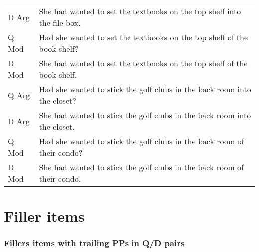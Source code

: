 \documentclass[11pt,oneside]{book}
\begin{document}
\begin{longtable}{ll}
D Arg & She had wanted to set the textbooks on the top shelf into the file box.\\
Q Mod & Had she wanted to set the textbooks on the top shelf of the book shelf?\\
D Mod & She had wanted to set the textbooks on the top shelf of the book shelf.\\
\addlinespace
Q Arg & Had she wanted to stick the golf clubs in the back room into the closet?\\
D Arg & She had wanted to stick the golf clubs in the back room into the closet.\\
Q Mod & Had she wanted to stick the golf clubs in the back room of their condo?\\
D Mod & She had wanted to stick the golf clubs in the back room of their condo.\\*
\end{longtable}

\newpage

\hypertarget{appFill}{%
\chapter{Filler items}\label{appFill}}

\hypertarget{fillers-items-with-trailing-pps-in-qd-pairs}{%
\subsection*{Fillers items with trailing PPs in Q/D pairs}\label{fillers-items-with-trailing-pps-in-qd-pairs}}
\end{document}
